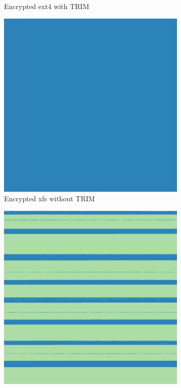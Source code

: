 \documentclass[
  digital, %
  color,   %
  oneside, %
  lof,     %
  nolot,     %
]{fithesis4}
\begin{document}
\begin{figure}
\begin{subfigure}[t]{0.45\textwidth}
    \caption{Encrypted ext4 with TRIM}
    \label{fig:trim-ext4-trim}
  \end{subfigure}
  \begin{subfigure}[b]{0.45\textwidth}
    \centering
    \includegraphics[width=\textwidth,interpolate=false]{test-xfs-no-trim-chi2-4-sweeping.png}
    \caption{Encrypted xfs without TRIM}
    \label{fig:trim-xfs-no-trim}
  \end{subfigure}
  \hfill
  \begin{subfigure}[b]{0.45\textwidth}
    \centering
    \includegraphics[width=\textwidth,interpolate=false]{test-xfs-chi2-4-sweeping.png}

\end{subfigure}
\end{figure}
\end{document}
